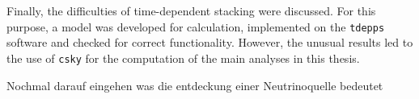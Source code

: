 Finally, the difficulties of time-dependent stacking were discussed.
For this purpose, a model was developed for calculation, implemented on the \texttt{tdepps} software and checked for correct functionality.
However, the unusual results led to the use of \texttt{csky} for the computation of the main analyses in this thesis.

Nochmal darauf eingehen was die entdeckung einer Neutrinoquelle bedeutet

%
